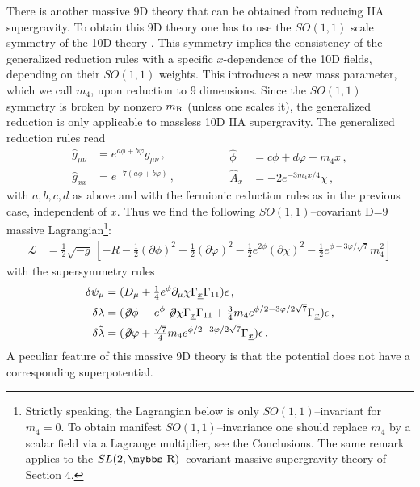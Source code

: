 \documentclass[12pt,a4paper]{article}
\def\bbs#1{\hbox{\mybbs#1}}
\begin{document}
There is another massive 9D theory that can be obtained from reducing IIA
supergravity. To obtain this 9D theory
 one has to use the $SO(1,1)$ scale symmetry of the 10D theory
 \cite{Lavrinenko:1998qa}.
This symmetry
implies the consistency of the generalized reduction rules with a specific
$x$-dependence of the 10D fields, depending on their $SO(1,1)$ weights.
This introduces a new mass parameter, which we call $m_4$,
 upon reduction to 9 dimensions.
Since the $SO(1,1)$ symmetry is broken by nonzero $m_{\rm R}$
(unless one scales it), the generalized reduction is only applicable to
 massless 10D IIA supergravity.
The generalized reduction rules read
\begin{equation}
\begin{aligned}
  \hat{g}_{\mu\nu} & = e^{a \phi + b \varphi} g_{\mu\nu}\, , \\
  \hat{g}_{xx} & = e^{-7(a \phi + b \varphi)}\, , \qquad
\end{aligned} \qquad
\begin{aligned}
  \hat{\phi} & = c \phi + d \varphi + m_4 x\, , \\
  \hat{A}_x & = - 2 e^{-3m_4 x/4} \chi \,,
\end{aligned}
\end{equation}
with $a,b,c,d$ as above  and with the fermionic reduction rules as
in the previous case, independent of $x$. Thus we find the
following $SO(1,1)$--covariant D=9 massive
Lagrangian\footnote{Strictly speaking, the Lagrangian below is
only $SO(1,1)$--invariant for $m_4=0$. To obtain manifest
$SO(1,1)$--invariance one should replace $m_4$ by a scalar field
via a Lagrange multiplier, see the Conclusions. The same remark
applies to the $SL(2,\bbs{R})$--covariant massive supergravity
theory of Section 4.}:
\begin{align}
  \mathcal{L}
  & = \tfrac{1}{2} \sqrt{-{g}} \,
   \left[ -{R} - \tfrac{1}{2} (\partial \phi)^2 - \tfrac{1}{2} (\partial \varphi)^2
    - \tfrac{1}{2} e^{2 \phi} (\partial \chi)^2
    - \tfrac{1}{2} e^{\phi -3 \varphi / \sqrt{7} } m_4^2\right]
\end{align}
with the supersymmetry rules
\begin{equation}
\begin{aligned}
  \delta \psi_\mu & = (D_\mu
    + \tfrac{1}{4} e^\phi \partial_\mu \chi \Gamma_{\underline{x}} \Gamma_{11}
    ) \epsilon \,, \\
  \delta \lambda
  & = (\not \! \partial \phi\, - e^\phi \not \! \partial \chi \Gamma_{\underline{x}} \Gamma_{11}
    +\tfrac{3}{4} m_4 e^{\phi/2 -3 \varphi /2 \sqrt{7}} \Gamma_{\underline{x}}) \epsilon \,, \\\
  \delta \tilde{\lambda}
  & =  (\not \! \partial \varphi
    +\tfrac{\sqrt{7}}{4} m_4 e^{\phi/2 -3 \varphi /2 \sqrt{7}} \Gamma_{\underline{x}}) \epsilon \,.
\end{aligned}
\label{class4susy}
\end{equation}
A peculiar feature of this massive 9D theory is that the potential does not have a corresponding superpotential.
\end{document}
